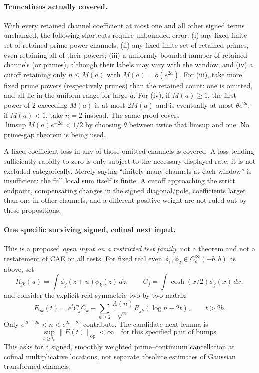 \paragraph{Truncations actually covered.}
With every retained channel coefficient at most one and all other
signed terms unchanged, the following shortcuts require unbounded error:
(i) any fixed finite set of retained prime-power channels; (ii) any
fixed finite set of retained primes, even retaining all of their powers;
(iii) a uniformly bounded number of retained channels (or primes),
although their labels may vary with the window; and (iv) a cutoff
retaining only $n\le M(a)$ with $M(a)=o(e^{2a})$.
For (iii), take more fixed prime powers (respectively primes) than the
retained count: one is omitted, and all lie in the uniform range for
large $a$. For (iv), if $M(a)\ge1$, the first power of $2$ exceeding
$M(a)$ is at most $2M(a)$ and is eventually at most $\theta e^{2a}$;
if $M(a)<1$, take $n=2$ instead. The same proof covers
$\limsup M(a)e^{-2a}<1/2$ by choosing $\theta$ between twice that
limsup and one. No prime-gap theorem is being used.

A fixed coefficient loss in any of those omitted channels is covered.
A loss tending sufficiently rapidly to zero is only subject to the
necessary displayed rate; it is not excluded categorically. Merely
saying ``finitely many channels at each window'' is insufficient:
the full local sum itself is finite. A cutoff approaching the strict
endpoint, compensating changes in the signed diagonal/pole, coefficients
larger than one in other channels, and a different positive weight are
not ruled out by these propositions.

\paragraph{One specific surviving signed, cofinal next input.}
This is a proposed \emph{open input on a restricted test family}, not
a theorem and not a restatement of CAE on all tests. For fixed real even
$\phi_1,\phi_2\in C_c^\infty(-b,b)$ as above, set
\[
 R_{jk}(u)=\int\phi_j(z+u)\phi_k(z)\,dz,\qquad
 C_j=\int\cosh(x/2)\phi_j(x)\,dx,
\]
and consider the explicit real symmetric two-by-two matrix
\[
 E_{jk}(t)=e^t C_jC_k-
       \sum_{n\ge2}\frac{\Lambda(n)}{\sqrt n}
                          R_{jk}(\log n-2t),\qquad t>2b.
\]
Only $e^{2t-2b}<n<e^{2t+2b}$ contribute. The candidate next lemma is
\[
 \sup_{t\ge t_0}\|E(t)\|_{\mathrm{op}}<\infty
 \quad\text{for this specified pair of bumps.}
\]
This asks for a signed, smoothly weighted prime--continuum cancellation
at cofinal multiplicative locations, not separate absolute estimates
of Gaussian transformed channels.


